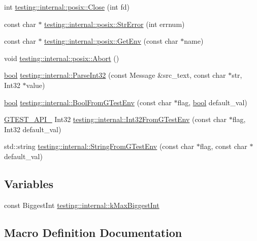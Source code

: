 \begin{DoxyCompactItemize}
\item 
int \hyperlink{namespacetesting_1_1internal_1_1posix_a15e5b8f2a535ef1b2529b85b861e4846}{testing\+::internal\+::posix\+::\+Close} (int fd)
\item 
const char $\ast$ \hyperlink{namespacetesting_1_1internal_1_1posix_a4b77b14af6f4d18f83d303b98e9349c4}{testing\+::internal\+::posix\+::\+Str\+Error} (int errnum)
\item 
const char $\ast$ \hyperlink{namespacetesting_1_1internal_1_1posix_a1d5e3da5a27eed25986859fa83cafe95}{testing\+::internal\+::posix\+::\+Get\+Env} (const char $\ast$name)
\item 
void \hyperlink{namespacetesting_1_1internal_1_1posix_a69b8278c59359dd6a6f941b4643db9fb}{testing\+::internal\+::posix\+::\+Abort} ()
\item 
\hyperlink{classbool}{bool} \hyperlink{namespacetesting_1_1internal_ac06fc81336a3d80755f4020d34321766}{testing\+::internal\+::\+Parse\+Int32} (const Message \&src\+\_\+text, const char $\ast$str, Int32 $\ast$value)
\item 
\hyperlink{classbool}{bool} \hyperlink{namespacetesting_1_1internal_a67132cdce23fb71b6c38ee34ef81eb4c}{testing\+::internal\+::\+Bool\+From\+G\+Test\+Env} (const char $\ast$flag, \hyperlink{classbool}{bool} default\+\_\+val)
\item 
\hyperlink{gtest-port_8h_aa73be6f0ba4a7456180a94904ce17790}{G\+T\+E\+S\+T\+\_\+\+A\+P\+I\+\_\+} Int32 \hyperlink{namespacetesting_1_1internal_a0f7e728793f9e6cb0aa2b69eaa468bf3}{testing\+::internal\+::\+Int32\+From\+G\+Test\+Env} (const char $\ast$flag, Int32 default\+\_\+val)
\item 
std\+::string \hyperlink{namespacetesting_1_1internal_ac54dabc540bf79c2de91add679bfb93b}{testing\+::internal\+::\+String\+From\+G\+Test\+Env} (const char $\ast$flag, const char $\ast$default\+\_\+val)
\end{DoxyCompactItemize}
\subsection*{Variables}
\begin{DoxyCompactItemize}
\item 
const Biggest\+Int \hyperlink{namespacetesting_1_1internal_ad901880198832bc166d2493096b451f7}{testing\+::internal\+::k\+Max\+Biggest\+Int}
\end{DoxyCompactItemize}


\subsection{Macro Definition Documentation}
\mbox{\label{gtest-port_8h_a00b3684a621ce1422b55a0e7e8a6aecb}} 
